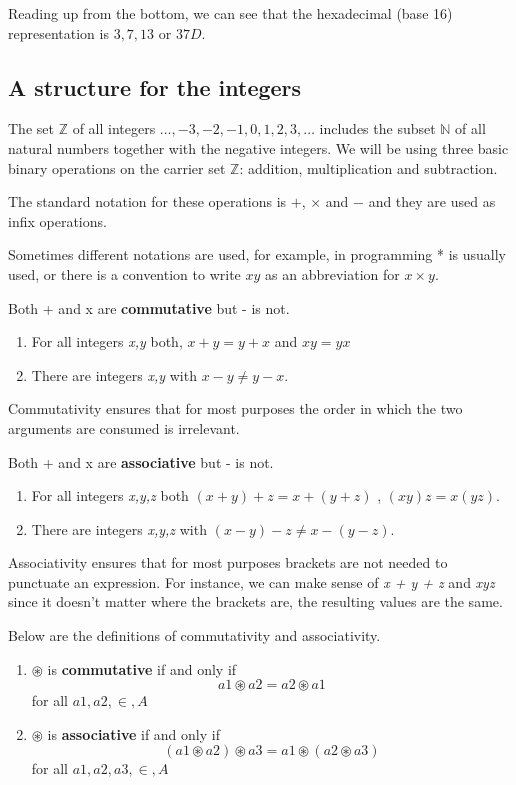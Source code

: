 Reading up from the bottom, we can see that the hexadecimal (base 16)
representation is $3,7,13$ or $37D$.

\subsection{A structure for the integers}

The set $\mathbb{Z}$ of all integers $\ldots,-3,-2,-1,0,1,2,3,\ldots$ includes
the subset $\mathbb{N}$ of all natural numbers together with the negative
integers. We will be using three basic binary operations on the carrier set
$\mathbb{Z}$: addition, multiplication and subtraction.

The standard notation for these operations is $+$, $\times$ and $-$ and they are
used as infix operations.

Sometimes different notations are used, for example, in programming * is usually
used, or there is a convention to write $xy$ as an abbreviation for $x \times
y$.
 
Both + and x are {\bf commutative} but - is not.

\begin{enumerate}
\item For all integers {\it x,y} both, $x + y = y + x$ and $xy = yx$
\item There are integers {\it x,y} with $x - y \ne y - x$.
\end{enumerate}

Commutativity ensures that for most purposes the order in which the two
arguments are consumed is irrelevant.

Both + and x are {\bf associative} but - is not.

\begin{enumerate}
\item For all integers {\it x,y,z} both $(x + y) + z = x + (y + z)$ , $(xy)z = x(yz)$.
\item There are integers {\it x,y,z} with $(x - y) - z \ne x - (y - z)$.
\end{enumerate}

Associativity ensures that for most purposes brackets are not needed to
punctuate an expression. For instance, we can make sense of {\it x + y + z} and
{\it xyz} since it doesn't matter where the brackets are, the resulting values
are the same.

Below are the definitions of commutativity and associativity.

\begin{enumerate}
  \item 
    $\circledast$ is {\bf commutative} if and only if
    \begin{dmath}
	a1 \circledast a2 = a2 \circledast a1
    \end{dmath} 
    for all $a1,a2,\in,A$
  \item 
    $\circledast$ is {\bf associative} if and only if
    \begin{dmath}
	(a1 \circledast a2) \circledast a3 = a1 \circledast (a2 \circledast a3)
    \end{dmath} 
    for all $a1,a2,a3,\in,A$
\end{enumerate}

